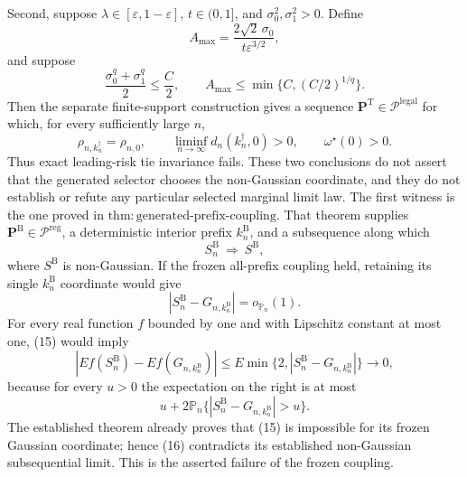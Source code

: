 Second, suppose \(\lambda\in[\varepsilon,1-\varepsilon]\), \(t\in(0,1]\), and \(\sigma_0^2,\sigma_1^2>0\).  Define
\[
 A_{\max}=\frac{2\sqrt2\,\sigma_0}{t\varepsilon^{3/2}},
\]
and suppose
\[
 \frac{\sigma_0^q+\sigma_1^q}{2}\leq\frac C2,
 \qquad
 A_{\max}\leq\min\{C,(C/2)^{1/q}\}.
\]
Then the separate finite-support construction gives a sequence \(\mathbf P^{\mathrm T}\in\mathcal P^{\mathrm{legal}}\) for which, for every sufficiently large \(n\),
\[
 \rho_{n,k_n^{\dagger}}=\rho_{n,0},
 \qquad
 \liminf_{n\to\infty}d_n(k_n^{\dagger},0)>0,
 \qquad
 \omega^{\star}(0)>0.
\]
Thus exact leading-risk tie invariance fails.  These two conclusions do not assert that the generated selector chooses the non-Gaussian coordinate, and they do not establish or refute any particular selected marginal limit law.
The first witness is the one proved in \(\mathrm{thm:generated\text{-}prefix\text{-}coupling}\).  That theorem supplies \(\mathbf P^{\mathrm B}\in\mathcal P^{\mathrm{reg}}\), a deterministic interior prefix \(k_n^{\mathrm B}\), and a subsequence along which
\[
 S_n^{\mathrm B}\ \Rightarrow\ S^{\mathrm B}, \tag{14}
\]
where \(S^{\mathrm B}\) is non-Gaussian.  If the frozen all-prefix coupling held, retaining its single \(k_n^{\mathrm B}\) coordinate would give
\[
 |S_n^{\mathrm B}-G_{n,k_n^{\mathrm B}}|
 =o_{\mathbb P_n}(1). \tag{15}
\]
For every real function \(f\) bounded by one and with Lipschitz constant at most one, (15) would imply
\[
 \left|E f(S_n^{\mathrm B})-E f(G_{n,k_n^{\mathrm B}})\right|
 \leq E\min\{2,|S_n^{\mathrm B}-G_{n,k_n^{\mathrm B}}|\}
 \longrightarrow0, \tag{16}
\]
because for every \(u>0\) the expectation on the right is at most
\[
 u+2\mathbb P_n\{|S_n^{\mathrm B}-G_{n,k_n^{\mathrm B}}|>u\}.
\]
The established theorem already proves that (15) is impossible for its frozen Gaussian coordinate; hence (16) contradicts its established non-Gaussian subsequential limit.  This is the asserted failure of the frozen coupling.

